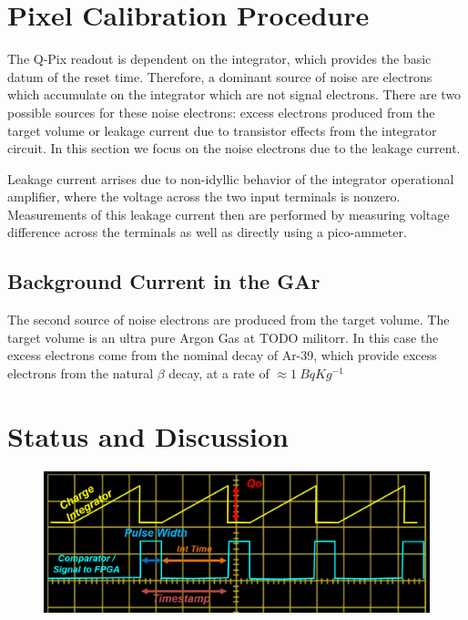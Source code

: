 \section{Pixel Calibration Procedure}

The Q-Pix readout is dependent on the integrator, which provides the basic datum of the reset time.
Therefore, a dominant source of noise are electrons which accumulate on the integrator which are not signal electrons.
There are two possible sources for these noise electrons: excess electrons produced from the target volume or leakage current due to transistor effects from the integrator circuit.
In this section we focus on the noise electrons due to the leakage current.

Leakage current arrises due to non-idyllic behavior of the integrator operational amplifier, where the voltage across the two input terminals is nonzero.
Measurements of this leakage current then are performed by measuring voltage difference across the terminals as well as directly using a pico-ammeter.

\subsection{Background Current in the GAr}

The second source of noise electrons are produced from the target volume.
The target volume is an ultra pure Argon Gas at TODO militorr.
In this case the excess electrons come from the nominal decay of Ar-39, which provide excess electrons from the natural $\beta$ decay, at a rate of $\approx 1~\unit{Bq}{Kg^{-1}}$

\section{Status and Discussion}


\begin{figure}[]
\centering
\includegraphics[width=\textwidth]{images/saq_example_reconstruction.png}
\caption{}
\label{fig:saq_reconstruction}
\end{figure}


